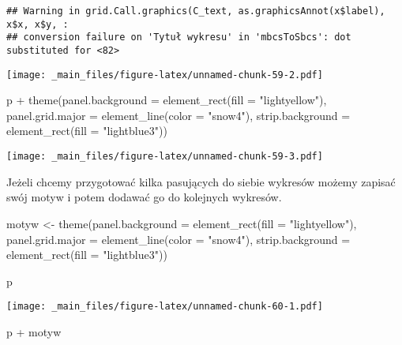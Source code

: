 \documentclass[
]{book}
\newenvironment{Shaded}{\begin{snugshade}}{\end{snugshade}}
\newcommand{\AttributeTok}[1]{\textcolor[rgb]{0.77,0.63,0.00}{#1}}
\newcommand{\FunctionTok}[1]{\textcolor[rgb]{0.00,0.00,0.00}{#1}}
\newcommand{\NormalTok}[1]{#1}
\newcommand{\OtherTok}[1]{\textcolor[rgb]{0.56,0.35,0.01}{#1}}
\newcommand{\SpecialCharTok}[1]{\textcolor[rgb]{0.00,0.00,0.00}{#1}}
\newcommand{\StringTok}[1]{\textcolor[rgb]{0.31,0.60,0.02}{#1}}
\begin{document}
\begin{verbatim}
## Warning in grid.Call.graphics(C_text, as.graphicsAnnot(x$label), x$x, x$y, :
## conversion failure on 'Tytuł wykresu' in 'mbcsToSbcs': dot substituted for <82>
\end{verbatim}

\texttt{[image: \_main\_files/figure-latex/unnamed-chunk-59-2.pdf]}

\begin{Shaded}
\begin{Highlighting}[]
\NormalTok{p }\SpecialCharTok{+} \FunctionTok{theme}\NormalTok{(}\AttributeTok{panel.background =} \FunctionTok{element\_rect}\NormalTok{(}\AttributeTok{fill =} \StringTok{"lightyellow"}\NormalTok{), }
          \AttributeTok{panel.grid.major =} \FunctionTok{element\_line}\NormalTok{(}\AttributeTok{color =} \StringTok{"snow4"}\NormalTok{),}
          \AttributeTok{strip.background =} \FunctionTok{element\_rect}\NormalTok{(}\AttributeTok{fill =} \StringTok{"lightblue3"}\NormalTok{))}
\end{Highlighting}
\end{Shaded}

\texttt{[image: \_main\_files/figure-latex/unnamed-chunk-59-3.pdf]}

Jeżeli chcemy przygotować kilka pasujących do siebie wykresów możemy zapisać swój motyw i potem dodawać go do kolejnych wykresów.

\begin{Shaded}
\begin{Highlighting}[]
\NormalTok{motyw }\OtherTok{\textless{}{-}} \FunctionTok{theme}\NormalTok{(}\AttributeTok{panel.background =} \FunctionTok{element\_rect}\NormalTok{(}\AttributeTok{fill =} \StringTok{"lightyellow"}\NormalTok{), }
               \AttributeTok{panel.grid.major =} \FunctionTok{element\_line}\NormalTok{(}\AttributeTok{color =} \StringTok{"snow4"}\NormalTok{),}
               \AttributeTok{strip.background =} \FunctionTok{element\_rect}\NormalTok{(}\AttributeTok{fill =} \StringTok{"lightblue3"}\NormalTok{))}

\NormalTok{p}
\end{Highlighting}
\end{Shaded}

\texttt{[image: \_main\_files/figure-latex/unnamed-chunk-60-1.pdf]}

\begin{Shaded}
\begin{Highlighting}[]
\NormalTok{p }\SpecialCharTok{+}\NormalTok{ motyw}
\end{Highlighting}
\end{Shaded}
\end{document}
